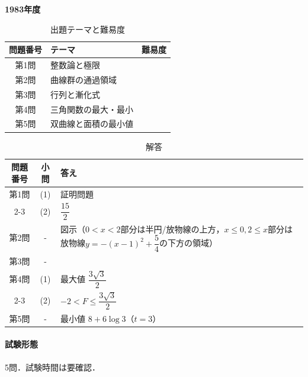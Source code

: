 \documentclass[../../main.tex]{subfiles}
\begin{document}
\begin{center}
  {\fontsize{48pt}{58pt}\selectfont \textbf{1983}\normalsize\textbf{年度}}
\end{center}

\begin{table}[htb]
  \centering
  \caption{出題テーマと難易度}
  \begin{tabular}{|c|p{9cm}|c|}
    \hline
    \textbf{問題番号} & \textbf{テーマ} & \textbf{難易度} \\
    \hline
    第1問 & 整数論と極限 & \\
    \hline
    第2問 & 曲線群の通過領域 & \\
    \hline
    第3問 & 行列と漸化式 & \\
    \hline
    第4問 & 三角関数の最大・最小 & \\
    \hline
    第5問 & 双曲線と面積の最小値 & \\
    \hline
  \end{tabular}
\end{table}

\begin{table}[htb]
  \centering
  \caption{解答}
  \renewcommand{\arraystretch}{1.4}
  \begin{tabular}{|c|c|p{9cm}|}
    \hline
    \textbf{問題番号} & \textbf{小問} & \textbf{答え} \\
    \hline
    第1問 & (1) & 証明問題 \\
    \cline{2-3}
    & (2) & $\dfrac{15}{2}$ \\
    \hline
    第2問 & - & 図示（$0<x<2$部分は半円/放物線の上方，$x\le0,2\le x$部分は放物線$y=-(x-1)^2+\dfrac{5}{4}$の下方の領域） \\
    \hline
    第3問 & - &  \\
    \hline
    第4問 & (1) & 最大値 $\dfrac{3\sqrt{3}}{2}$ \\
    \cline{2-3}
    & (2) & $-2<F\le\dfrac{3\sqrt{3}}{2}$ \\
    \hline
    第5問 & - & 最小値 $8+6\log3$（$t=3$） \\
    \hline
  \end{tabular}
\end{table}

\paragraph{試験形態}
5問．試験時間は要確認．
\end{document}

